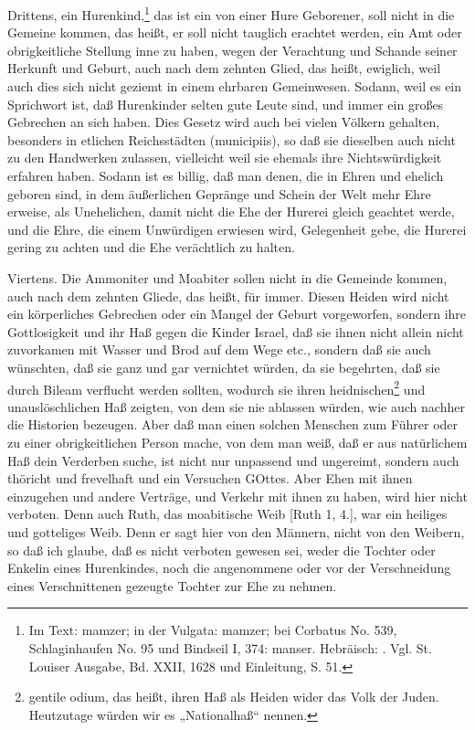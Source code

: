 Drittens, ein Hurenkind,\footnote{Im Text: mamzer; in der Vulgata: mamzer; bei Corbatus No. 539, Schlaginhaufen No. 95 und Bindseil I, 374: manser. Hebräisch: . Vgl. St. Louiser Ausgabe, Bd. XXII, 1628 und Einleitung, S. 51.} das ist ein von einer Hure Geborener, soll nicht in die Gemeine kommen, das heißt, er soll nicht tauglich erachtet werden, ein Amt oder obrigkeitliche Stellung inne zu haben, wegen der Verachtung und Schande seiner Herkunft und Geburt, auch nach dem zehnten Glied, das heißt, ewiglich, weil auch dies sich nicht geziemt in einem ehrbaren Gemeinwesen. Sodann, weil es ein Sprichwort ist, daß Hurenkinder selten gute Leute sind, und immer ein großes Gebrechen an sich haben. Dies Gesetz wird auch bei vielen Völkern gehalten, besonders in etlichen Reichsstädten (municipiis), so daß sie dieselben auch nicht zu den Handwerken zulassen, vielleicht weil sie ehemals ihre Nichtswürdigkeit erfahren haben. Sodann ist es billig, daß man denen, die in Ehren und ehelich geboren sind, in dem äußerlichen Gepränge und Schein der Welt mehr Ehre erweise, als Unehelichen, damit nicht die Ehe der Hurerei gleich geachtet werde, und die Ehre, die einem Unwürdigen erwiesen wird, Gelegenheit gebe, die Hurerei gering zu achten und die Ehe verächtlich zu halten.

Viertens. Die Ammoniter und Moabiter sollen nicht in die Gemeinde kommen, auch nach dem zehnten Gliede, das heißt, für immer. Diesen Heiden wird nicht ein körperliches Gebrechen oder ein Mangel der Geburt vorgeworfen, sondern ihre Gottlosigkeit und ihr Haß gegen die Kinder Israel, daß sie ihnen nicht allein nicht zuvorkamen mit Wasser und Brod auf dem Wege etc., sondern daß sie auch wünschten, daß sie ganz und gar vernichtet würden, da sie begehrten, daß sie durch Bileam verflucht werden sollten, wodurch sie ihren heidnischen\footnote{gentile odium, das heißt, ihren Haß als Heiden wider das Volk der Juden. Heutzutage würden wir es „Nationalhaß“ nennen.} und unauslöschlichen Haß zeigten, von dem sie nie ablassen würden, wie auch nachher die Historien bezeugen. Aber daß man einen solchen Menschen zum Führer oder zu einer obrigkeitlichen Person mache, von dem man weiß, daß er aus natürlichem Haß dein Verderben suche, ist nicht nur unpassend und ungereimt, sondern auch thöricht und frevelhaft und ein Versuchen GOttes. Aber Ehen mit ihnen einzugehen und andere Verträge, und Verkehr mit ihnen zu haben, wird hier nicht verboten. Denn auch Ruth, das moabitische Weib [Ruth 1, 4.], war ein heiliges und gotteliges Weib. Denn er sagt hier von den Männern, nicht von den Weibern, so daß ich glaube, daß es nicht verboten gewesen sei, weder die Tochter oder Enkelin eines Hurenkindes, noch die angenommene oder vor der Verschneidung eines Verschnittenen gezeugte Tochter zur Ehe zu nehmen.

